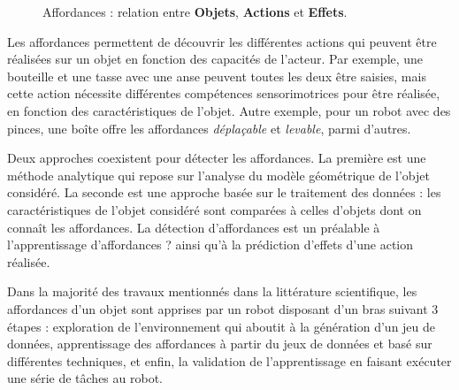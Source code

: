\documentclass[draft]{llncs}
\begin{document}
\begin{figure}
  \centering

  \label{fig:affordances}
	\caption{Affordances : relation entre \textbf{Objets}, \textbf{Actions} et \textbf{Effets}.}

\end{figure}

Les affordances permettent de découvrir les différentes actions qui peuvent être réalisées sur un objet en fonction des capacités de l'acteur.
Par exemple, une bouteille et une tasse avec une anse peuvent toutes les deux être saisies, mais cette action nécessite différentes compétences sensorimotrices pour être réalisée, en fonction des caractéristiques de l'objet.
Autre exemple, pour un robot avec des pinces, une boîte offre les affordances \textit{déplaçable} et \textit{levable}, parmi d'autres.

Deux  approches coexistent pour détecter les affordances.
La première est une méthode analytique qui repose sur l'analyse du modèle géométrique de l'objet considéré.
La seconde est une approche basée sur le traitement des données : les caractéristiques de l'objet considéré sont comparées à celles d'objets dont on connaît les affordances.
La détection d'affordances est un préalable à l'apprentissage d'affordances \cite{Jamone2016} ? ainsi qu'à la prédiction d'effets d'une action réalisée.


Dans la majorité des travaux mentionnés dans la littérature scientifique, les affordances d'un objet sont apprises par un robot disposant d'un bras suivant 3 étapes : exploration de l'environnement qui aboutit à la génération d'un jeu de données, apprentissage des affordances à partir du jeux de données et basé sur différentes techniques, et enfin, la validation de l'apprentissage en faisant exécuter une série de tâches au robot.
\end{document}
